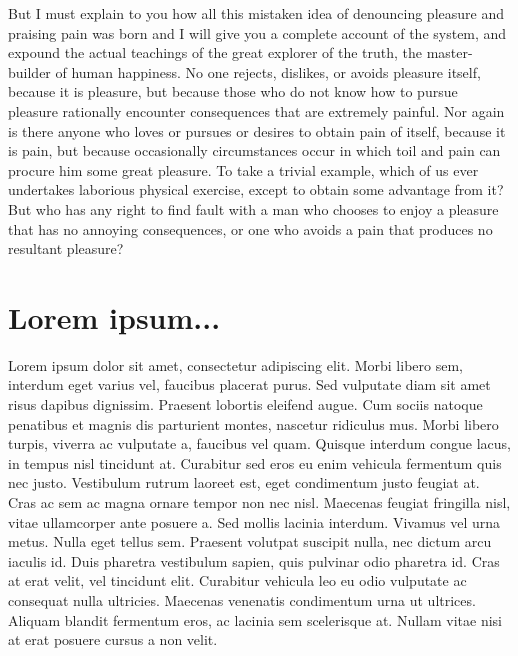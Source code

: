 \documentclass{book}
\begin{document}
But I must explain to you how all this mistaken idea of denouncing pleasure
and praising pain was born and I will give you a complete account of the
system, and expound the actual teachings of the great explorer of the truth,
the master-builder of human happiness. No one rejects, dislikes, or avoids
pleasure itself, because it is pleasure, but because those who do not know how
to pursue pleasure rationally encounter consequences that are extremely painful.
Nor again is there anyone who loves or pursues or desires to obtain pain of
itself, because it is pain, but because occasionally circumstances occur in
which toil and pain can procure him some great pleasure. To take a trivial
example, which of us ever undertakes laborious physical exercise, except to
obtain some advantage from it? But who has any right to find fault with a man
who chooses to enjoy a pleasure that has no annoying consequences, or one who
avoids a pain that produces no resultant pleasure?



\newpage
\thispagestyle{empty}



\chapter{Lorem ipsum...}

Lorem ipsum dolor sit amet, consectetur adipiscing elit. Morbi libero sem,
interdum eget varius vel, faucibus placerat purus. Sed vulputate diam sit amet
risus dapibus dignissim. Praesent lobortis eleifend augue. Cum sociis natoque
penatibus et magnis dis parturient montes, nascetur ridiculus mus. Morbi libero
turpis, viverra ac vulputate a, faucibus vel quam. Quisque interdum congue
lacus, in tempus nisl tincidunt at. Curabitur sed eros eu enim vehicula
fermentum quis nec justo. Vestibulum rutrum laoreet est, eget condimentum justo
feugiat at. Cras ac sem ac magna ornare tempor non nec nisl. Maecenas feugiat
fringilla nisl, vitae ullamcorper ante posuere a. Sed mollis lacinia interdum.
Vivamus vel urna metus. Nulla eget tellus sem. Praesent volutpat suscipit nulla,
nec dictum arcu iaculis id. Duis pharetra vestibulum sapien, quis pulvinar odio
pharetra id. Cras at erat velit, vel tincidunt elit. Curabitur vehicula leo eu
odio vulputate ac consequat nulla ultricies. Maecenas venenatis condimentum
urna ut ultrices. Aliquam blandit fermentum eros, ac lacinia sem scelerisque
at. Nullam vitae nisi at erat posuere cursus a non velit.
\end{document}
